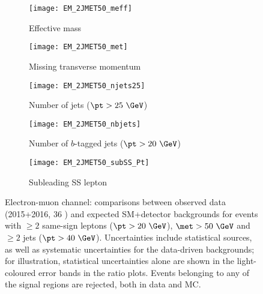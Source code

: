 \begin{figure}[t!]
\centering
\begin{subfigure}[t]{0.48\textwidth}
\texttt{[image: EM\_2JMET50\_meff]}
\caption{Effective mass \meff}
\end{subfigure}
\begin{subfigure}[t]{0.48\textwidth}
\texttt{[image: EM\_2JMET50\_met]}
\caption{Missing transverse momentum \met}
\end{subfigure}
\begin{subfigure}[t]{0.48\textwidth}
\texttt{[image: EM\_2JMET50\_njets25]}
\caption{Number of jets ($\pt>25~\GeV$)}
\end{subfigure}
\begin{subfigure}[t]{0.48\textwidth}
\texttt{[image: EM\_2JMET50\_nbjets]}
\caption{Number of $b$-tagged jets ($\pt>20~\GeV$)}
\end{subfigure}
\begin{subfigure}[t]{0.48\textwidth}
\texttt{[image: EM\_2JMET50\_subSS\_Pt]}
\caption{Subleading SS lepton \pt}
\end{subfigure}
\caption{Electron-muon channel: comparisons between observed data (2015+2016, 36 \ifb) and expected SM+detector backgrounds 
for events with $\ge 2$ same-sign leptons ($\pt>20~\GeV$), $\met>50~\GeV$ and $\ge 2$ jets ($\pt>40~\GeV$). 
Uncertainties include statistical sources, as well as systematic uncertainties for the data-driven backgrounds; 
for illustration, statistical uncertainties alone are shown in the light-coloured error bands in the ratio plots. 
Events belonging to any of the signal regions are rejected, both in data and MC.  
}
\label{fig:distributions_channelEM_2015}
\end{figure} 

